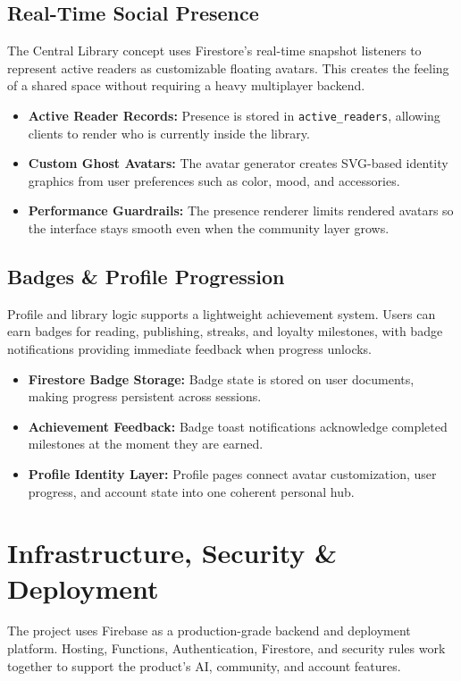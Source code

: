 \documentclass[11pt, a4paper]{article}
\begin{document}
\subsection{Real-Time Social Presence}
The Central Library concept uses Firestore's real-time snapshot listeners to represent active readers as customizable floating avatars. This creates the feeling of a shared space without requiring a heavy multiplayer backend.

\begin{itemize}[label=\textcolor{abookigold}{\textbullet}]
    \item \textbf{Active Reader Records:} Presence is stored in \texttt{active\_readers}, allowing clients to render who is currently inside the library.
    \item \textbf{Custom Ghost Avatars:} The avatar generator creates SVG-based identity graphics from user preferences such as color, mood, and accessories.
    \item \textbf{Performance Guardrails:} The presence renderer limits rendered avatars so the interface stays smooth even when the community layer grows.
\end{itemize}

\subsection{Badges \& Profile Progression}
Profile and library logic supports a lightweight achievement system. Users can earn badges for reading, publishing, streaks, and loyalty milestones, with badge notifications providing immediate feedback when progress unlocks.

\begin{itemize}[label=\textcolor{abookigold}{\textbullet}]
    \item \textbf{Firestore Badge Storage:} Badge state is stored on user documents, making progress persistent across sessions.
    \item \textbf{Achievement Feedback:} Badge toast notifications acknowledge completed milestones at the moment they are earned.
    \item \textbf{Profile Identity Layer:} Profile pages connect avatar customization, user progress, and account state into one coherent personal hub.
\end{itemize}

\section{Infrastructure, Security \& Deployment}
The project uses Firebase as a production-grade backend and deployment platform. Hosting, Functions, Authentication, Firestore, and security rules work together to support the product's AI, community, and account features.
\end{document}
